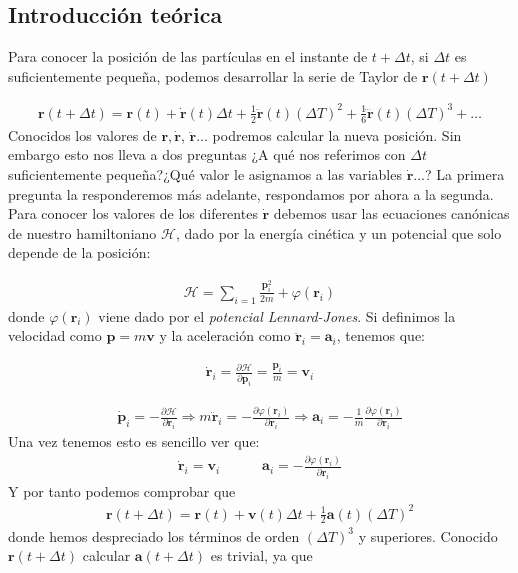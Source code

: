 \documentclass[11pt]{article} %
\newcommand{\parciales}[2]{\frac{\partial #1}{\partial #2}}
\newcommand{\tquad}{\quad \quad \quad}
\newcommand{\Hcal}{\mathcal{H}}
\newcommand{\an}{\mathbf{a}}
\newcommand{\pn}{\mathbf{p}}
\newcommand{\rn}{\mathbf{r}}
\newcommand{\vn}{\mathbf{v}}
\begin{document}
\subsection{Introducción teórica}

Para conocer la posición de las partículas en el instante de $t + \Delta t$, si $\Delta t$ es suficientemente pequeña, podemos desarrollar la serie de Taylor de $\rn(t+\Delta t)$

\begin{eqnarray}
	\rn(t+\Delta t) = \rn (t) + \dot{\rn} (t) \Delta t + \frac{1}{2} \ddot{\rn} (t) (\Delta T)^2 + \frac{1}{6} \dddot{\rn} (t) (\Delta T)^3 + \ldots
\end{eqnarray}
Conocidos los valores de $\rn,\dot{\rn}$, $\ddot{\rn}...$ podremos calcular la nueva posición. Sin embargo esto nos lleva a dos preguntas ¿A qué nos referimos con $\Delta t$ suficientemente pequeña?¿Qué valor le asignamos a las variables $\dot{\rn}...$? La primera pregunta la responderemos más adelante, respondamos por ahora a la segunda. Para conocer los valores de los diferentes $\dot{\rn}$ debemos usar las ecuaciones canónicas de nuestro hamiltoniano  $\Hcal$, dado por la energía cinética y un potencial que solo depende de la posición:

\begin{eqnarray}
	\Hcal = \sum_{i=1} \frac{\pn_i^2}{2m} + \varphi (\rn_i)
\end{eqnarray}
donde $\varphi(\rn_i)$ viene dado por el \textit{potencial Lennard-Jones}. Si definimos la velocidad como $\pn=m\vn$ y la aceleración como $\ddot{\rn}_i = \an_i$, tenemos que:

\begin{eqnarray}
	\dot{\rn}_i = \parciales{\Hcal}{\pn_i} = \frac{\pn_i}{m} = \vn_i
\end{eqnarray}

\begin{eqnarray}
	\dot{\pn}_i = - \parciales{\Hcal}{\rn_i} \Rightarrow  m \ddot{\rn}_i = - \parciales{\varphi(\rn_i)}{\rn_i} \Rightarrow \an_i =  - \frac{1}{m} \parciales{\varphi(\rn_i)}{\rn_i}
\end{eqnarray}
Una vez tenemos esto es sencillo ver que:
\begin{eqnarray}
	\dot{\rn}_i = \vn_i \tquad \an_i = - \parciales{\varphi(\rn_i)}{\rn_i}
\end{eqnarray}
Y por tanto podemos comprobar que 
\begin{eqnarray}
	\rn(t+\Delta t) = \rn(t) + \vn(t) \Delta t + \frac{1}{2} \an (t) (\Delta T)^2
\end{eqnarray}
donde hemos despreciado los términos de orden $(\Delta T)^3$ y superiores. Conocido  $\rn(t+\Delta t)$ calcular $\an(t+\Delta t)$ es trivial, ya que 
\end{document}
